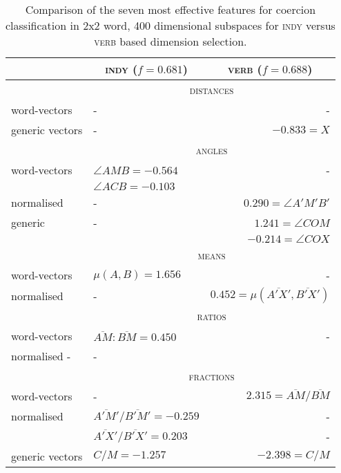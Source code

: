 \begin{table}
\centering
\begin{tabular}{llr}
\hline
& \multicolumn{1}{c}{\textsc{indy} ($f = 0.681$)} & \multicolumn{1}{c}{\textsc{verb} ($f = 0.688$)} \\
\hline
& \multicolumn{2}{c}{\textsc{distances}} \\
word-vectors & - & - \\
generic vectors & - & $-0.833 = X$ \\
\hline
& \multicolumn{2}{c}{\textsc{angles}} \\
word-vectors & $\angle AMB = -0.564$ & - \\
& $\angle ACB = -0.103$ \\
normalised & - & $0.290 = \angle A'M'B'$ \\
generic & - & $1.241 = \angle COM$ \\
& & $-0.214 = \angle COX$ \\
\hline
& \multicolumn{2}{c}{\textsc{means}} \\
word-vectors & $\mu(A,B) = 1.656$ & - \\
normalised & - & $0.452 = \mu(\overline{A'X'},\overline{B'X'})$ \\
\hline
& \multicolumn{2}{c}{\textsc{ratios}} \\
word-vectors & $\overline{AM}:\overline{BM} = 0.450$ & - \\
normalised - & - \\
\hline
& \multicolumn{2}{c}{\textsc{fractions}} \\
word-vectors & - & $2.315 = \overline{AM}/\overline{BM}$ \\
normalised & $\overline{A'M'}/\overline{B'M'} = -0.259$ & - \\
& $\overline{A'X'}/\overline{B'X'} = 0.203$ & - \\
generic vectors & $C/M = -1.257$ & $-2.398 = C/M$ \\
\hline
\end{tabular}
\caption[Most Predictive Feature Vectors for Coercion Classification]{Comparison of the seven most effective features for coercion classification in 2x2 word, 400 dimensional subspaces for \textsc{indy} versus \textsc{verb} based dimension selection.}
\label{tab:coertures}
\end{table}

